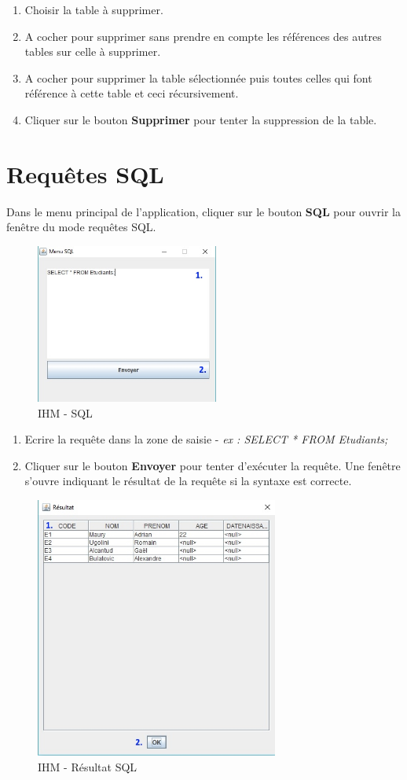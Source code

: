 \begin{enumerate}
\item Choisir la table à supprimer.
\item A cocher pour supprimer sans prendre en compte les références des autres tables sur celle à supprimer.
\item A cocher pour supprimer la table sélectionnée puis toutes celles qui font référence à cette table et ceci récursivement.
\item Cliquer sur le bouton \textbf{Supprimer} pour tenter la suppression de la table.
\end{enumerate}

\section{Requ\^etes SQL}
Dans le menu principal de l'application, cliquer sur le bouton \textbf{SQL} pour ouvrir la fen\^etre du mode requ\^etes SQL.
\begin{figure}[!h]
\centering
\includegraphics[width=6cm]{./images/manuel/sql.jpg}
\caption{IHM - SQL}
\label{sql}
\end{figure}

\begin{enumerate}
\item Ecrire la requ\^ete dans la zone de saisie - \textit{ex : SELECT * FROM Etudiants;} 
\item Cliquer sur le bouton \textbf{Envoyer} pour tenter d'exécuter la requ\^ete.
Une fenêtre s'ouvre indiquant le résultat de la requ\^ete si la syntaxe est correcte.
\end{enumerate}

\begin{figure}[!h]
\centering
\includegraphics[width=8cm]{./images/manuel/sql_result.jpg}
\caption{IHM - Résultat SQL}
\label{sql_result}
\end{figure}


